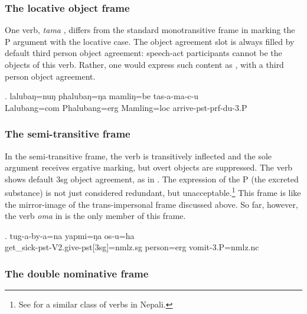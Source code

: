 \subsubsection{The locative object frame}\label{tr-loc}


\noindent
One verb,  \emph{tama} , differs from the standard monotransitive frame in  marking the P argument with the locative case.  The object agreement slot is always filled by default third person object agreement: speech-act participants cannot be the objects of this verb. Rather, one would express  such content as , with a third person object agreement.

\exg. lalubaŋ=nuŋ   phalubaŋ=ŋa   mamliŋ=be   tas-a-ma-c-u\\
Lalubang{\sc =com} Phalubang{\sc =erg} Mamling{\sc =loc} arrive{\sc -pst-prf-du-3.P}\\
 
  
 

\subsubsection{The semi-transitive frame}\label{tr-semi}


\noindent
In the semi-transitive frame, the verb is transitively inflected and the sole argument receives ergative marking, but overt objects are suppressed. The verb shows default 3sg object agreement, as in \Next. The expression of the P (the excreted substance) is not just considered redundant, but unacceptable.\footnote{See  \citet[1480]{Li2007Splitergativity} for a similar class of verbs in Nepali.} This frame is like the mirror-image of the trans-impersonal frame discussed above. So far, however, the verb \emph{oma}  in \Next is the only member of this frame.

\exg. tug-a-by-a=na yapmi=ŋa os-u=ha\\
 get\_sick{\sc -pst-V2.give-pst[3sg]=nmlz.sg} person{\sc =erg} vomit{\sc -3.P=nmlz.nc}\\


\subsubsection{The double nominative frame}\label{itr-teach}

